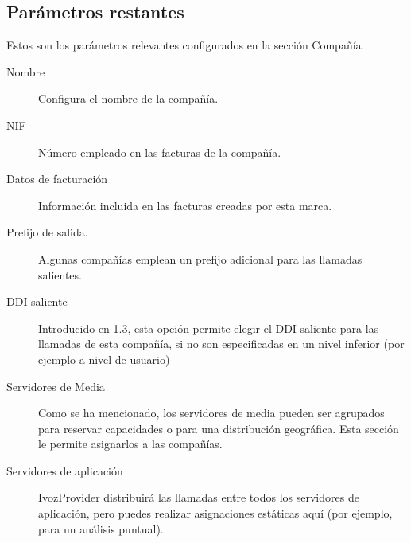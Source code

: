 \documentclass[letterpaper,10pt,spanish]{sphinxmanual}
\begin{document}
\subsection{Parámetros restantes}
\label{internal_calls/brand_portal:remaining-parameters}
Estos son los parámetros relevantes configurados en la sección Compañía:
\begin{description}
\item[{Nombre}] \leavevmode{}\label{internal_calls/brand_portal:term-name}
Configura el nombre de la compañía.

\item[{NIF}] \leavevmode{}\label{internal_calls/brand_portal:term-nif}
Número empleado en las facturas de la compañía.

\item[{Datos de facturación}] \leavevmode{}\label{internal_calls/brand_portal:term-invoice-data}
Información incluida en las facturas creadas por esta marca.

\item[{Prefijo de salida.}] \leavevmode{}\label{internal_calls/brand_portal:term-outbound-prefix}
Algunas compañías emplean un prefijo adicional para las llamadas salientes.

\item[{DDI saliente}] \leavevmode{}\label{internal_calls/brand_portal:term-outgoing-ddi}
Introducido en 1.3, esta opción permite elegir el DDI saliente para las llamadas de esta compañía, si no son especificadas en un nivel inferior (por ejemplo a nivel de usuario)

\item[{Servidores de Media}] \leavevmode{}\label{internal_calls/brand_portal:term-media-relay-set}
Como se ha mencionado, los servidores de media pueden ser agrupados para reservar capacidades o para una distribución geográfica. Esta sección le permite asignarlos a las compañías.

\item[{Servidores de aplicación}] \leavevmode{}\label{internal_calls/brand_portal:term-application-server}
IvozProvider distribuirá las llamadas entre todos los servidores de aplicación, pero puedes realizar asignaciones estáticas aquí (por ejemplo, para un análisis puntual).


\end{description}
\end{document}

